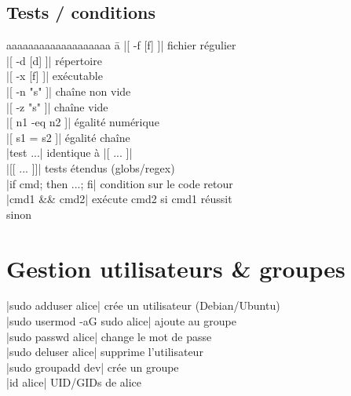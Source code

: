 \documentclass{article}
\newenvironment{cmdblock}{%
  \par\setlength{\parindent}{0pt}\setlength{\parskip}{0pt}%
  \RaggedRight%
}{\par}
\begin{document}
\begin{multicols}{4}
    \subsection*{Tests / conditions}
    \begin{tabbing}
        aaaaaaaaaaaaaaaaaaa \= a \kill
        \code|[ -f [f] ]| \> fichier régulier \\
        \code|[ -d [d] ]| \> répertoire \\
        \code|[ -x [f] ]| \> exécutable \\
        \code|[ -n "s" ]| \> chaîne non vide \\
        \code|[ -z "s" ]| \> chaîne vide \\
        \code|[ n1 -eq n2 ]| \> égalité numérique \\
        \code|[ s1 = s2 ]| \> égalité chaîne \\
        \code|test ...| \> identique à \code|[ ... ]| \\
        \code|[[ ... ]]| \> tests étendus (globs/regex) \\
        \code|if cmd; then ...; fi| \> condition sur le code retour \\
        \code|cmd1 && cmd2| \> exécute cmd2 si cmd1 réussit \\
         \> sinon \\
    \end{tabbing}

    \section*{Gestion utilisateurs \& groupes}
    \begin{cmdblock}
        \code|sudo adduser alice| \quad crée un utilisateur (Debian/Ubuntu) \\
        \code|sudo usermod -aG sudo alice| \quad ajoute au groupe \\
        \code|sudo passwd alice| \quad change le mot de passe \\
        \code|sudo deluser alice| \quad supprime l'utilisateur \\
        \code|sudo groupadd dev| \quad crée un groupe \\
        \code|id alice| \quad UID/GIDs de alice \\
    \end{cmdblock}


\end{multicols}
\end{document}
